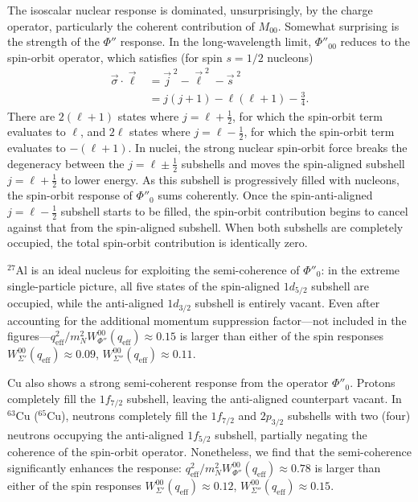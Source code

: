 \documentclass{book}[letterpaper,12pt]
\begin{document}
The isoscalar nuclear response is dominated, unsurprisingly, by the charge operator, particularly the coherent contribution of $M_{00}$. Somewhat surprising is the strength of the $\Phi''$ response. In the long-wavelength limit, $\Phi''_{00}$ reduces to the spin-orbit operator, which satisfies (for spin $s=1/2$ nucleons)
\begin{equation}
\begin{split}
\vec{\sigma}\cdot\vec{\ell}&=\vec{j}^{\;2}-\vec{\ell}^{\;2}-\vec{s}^{\;2}\\
&=j(j+1)-\ell(\ell+1)-\frac{3}{4}.
\end{split}
\end{equation}
There are $2(\ell+1)$ states where $j=\ell+\frac{1}{2}$, for which the spin-orbit term evaluates to $\ell$, and $2\ell$ states where $j=\ell-\frac{1}{2}$, for which the spin-orbit term evaluates to $-(\ell+1)$. In nuclei, the strong nuclear spin-orbit force breaks the degeneracy between the $j=\ell\pm\frac{1}{2}$ subshells and moves the spin-aligned subshell $j=\ell+\frac{1}{2}$ to lower energy. As this subshell is progressively filled with nucleons, the spin-orbit response of $\Phi''_{0}$ sums coherently. Once the spin-anti-aligned $j=\ell-\frac{1}{2}$ subshell starts to be filled, the spin-orbit contribution begins to cancel against that from the spin-aligned subshell. When both subshells are completely occupied, the total spin-orbit contribution is identically zero.

$^{27}$Al is an ideal nucleus for exploiting the semi-coherence of $\Phi''_{0}$: in the extreme single-particle picture, all five states of the spin-aligned $1d_{5/2}$ subshell are occupied, while the anti-aligned $1d_{3/2}$ subshell is entirely vacant. Even after accounting for the additional momentum suppression factor---not included in the figures---$q_\mathrm{eff}^2/m_N^2W_{\Phi''}^{00}(q_\mathrm{eff})\approx 0.15$ is larger than either of the spin responses $W_{\Sigma'}^{00}(q_\mathrm{eff})\approx 0.09$, $W_{\Sigma''}^{00}(q_\mathrm{eff})\approx 0.11$. 

Cu also shows a strong semi-coherent response from the operator $\Phi''_0$. Protons completely fill the $1f_{7/2}$ subshell, leaving the anti-aligned counterpart vacant. In $^{63}$Cu ($^{65}$Cu), neutrons completely fill the $1f_{7/2}$ and $2p_{3/2}$ subshells with two (four) neutrons occupying the anti-aligned $1f_{5/2}$ subshell, partially negating the coherence of the spin-orbit operator.  Nonetheless, we find that the semi-coherence significantly enhances the response: $q_\mathrm{eff}^2/m_N^2W_{\Phi''}^{00}(q_\mathrm{eff})\approx 0.78$ is larger than either of the spin responses $W_{\Sigma'}^{00}(q_\mathrm{eff})\approx 0.12$, $W_{\Sigma''}^{00}(q_\mathrm{eff})\approx 0.15$. 
\end{document}
